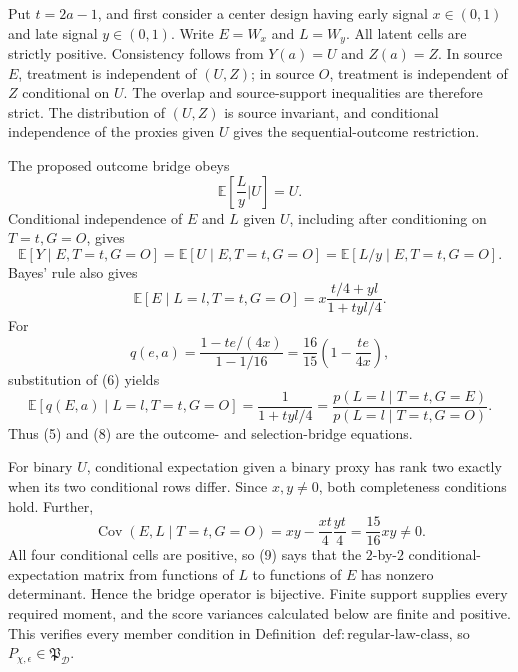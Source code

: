 Put \(t=2a-1\), and first consider a center design having early signal \(x\in(0,1)\) and late signal \(y\in(0,1)\). Write \(E=W_x\) and \(L=W_y\). All latent cells are strictly positive. Consistency follows from \(Y(a)=U\) and \(Z(a)=Z\). In source \(E\), treatment is independent of \((U,Z)\); in source \(O\), treatment is independent of \(Z\) conditional on \(U\). The overlap and source-support inequalities are therefore strict. The distribution of \((U,Z)\) is source invariant, and conditional independence of the proxies given \(U\) gives the sequential-outcome restriction.

The proposed outcome bridge obeys
\[
 \mathbb E\!\left[\frac{L}{y}\mathrel{\Big|}U\right]=U.
\]
Conditional independence of \(E\) and \(L\) given \(U\), including after conditioning on \(T=t,G=O\), gives
\[
 \mathbb E[Y\mid E,T=t,G=O]
 =\mathbb E[U\mid E,T=t,G=O]
 =\mathbb E[L/y\mid E,T=t,G=O].                         \tag{5}
\]
Bayes' rule also gives
\[
 \mathbb E[E\mid L=l,T=t,G=O]
 =x\frac{t/4+yl}{1+tyl/4}.                              \tag{6}
\]
For
\[
 q(e,a)=\frac{1-te/(4x)}{1-1/16}
 =\frac{16}{15}\left(1-\frac{te}{4x}\right),           \tag{7}
\]
substitution of (6) yields
\[
 \mathbb E[q(E,a)\mid L=l,T=t,G=O]
 =\frac1{1+tyl/4}
 =\frac{p(L=l\mid T=t,G=E)}{p(L=l\mid T=t,G=O)}.        \tag{8}
\]
Thus (5) and (8) are the outcome- and selection-bridge equations.

For binary \(U\), conditional expectation given a binary proxy has rank two exactly when its two conditional rows differ. Since \(x,y\ne0\), both completeness conditions hold. Further,
\[
 \operatorname{Cov}(E,L\mid T=t,G=O)
 =xy-\frac{xt}{4}\frac{yt}{4}=\frac{15}{16}xy\ne0.     \tag{9}
\]
All four conditional cells are positive, so (9) says that the \(2\)-by-\(2\) conditional-expectation matrix from functions of \(L\) to functions of \(E\) has nonzero determinant. Hence the bridge operator is bijective. Finite support supplies every required moment, and the score variances calculated below are finite and positive. This verifies every member condition in Definition~\(\mathrm{def{:}regular\text{-}law\text{-}class}\), so \(P_{\chi,\epsilon}\in\mathfrak P_{\mathcal D}\).

